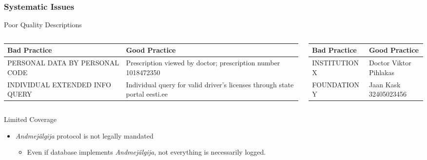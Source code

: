\documentclass[aspectratio=169,11pt]{beamer}
\begin{document}
\begin{frame}
\frametitle{Systematic Issues}
\begin{block}{Poor Quality Descriptions}
\begin{center}
\begin{columns}
\begin{column}{0.48\textwidth}
\begin{tabular}{|p{2.5cm}|p{3.5cm}|}
\hline
\textbf{Bad Practice} & \textbf{Good Practice} \\
\hline
PERSONAL DATA BY PERSONAL CODE & Prescription viewed by doctor; prescription number 1018472350 \\
\hline
INDIVIDUAL EXTENDED INFO QUERY & Individual query for valid driver's licenses through state portal eesti.ee \\
\hline
\end{tabular}
\end{column}
\begin{column}{0.48\textwidth}
\begin{tabular}{|p{2.5cm}|p{3.5cm}|}
\hline
\textbf{Bad Practice} & \textbf{Good Practice} \\
\hline
INSTITUTION X & Doctor Viktor Pihlakas \\
\hline
FOUNDATION Y & Jaan Kask 32405023456 \\
\hline
\end{tabular}
\end{column}
\end{columns}
\end{center}
\end{block}

\begin{block}{Limited Coverage}
\begin{itemize}
    \item \textit{Andmejälgija} protocol is not legally mandated
    \begin{itemize}
        \item Even if database implements \textit{Andmejälgija}, not everything is necessarily logged.
    \end{itemize}
\end{itemize}
\end{block}
\end{frame}
\end{document}

